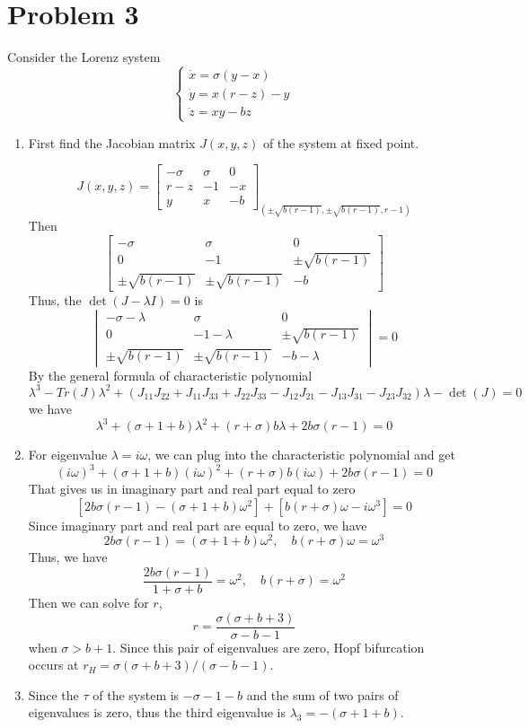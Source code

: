 \documentclass[12pt]{exam}
\begin{document}
\section*{Problem 3}
Consider the Lorenz system
\[ \begin{cases}
	\dot{x} = \sigma(y-x) \\
	\dot{y} = x(r - z) - y \\
	\dot{z} = xy - bz
\end{cases} \]

\begin{enumerate}
	\item First find the Jacobian matrix $J(x,y,z)$ of the system at fixed point.

	\[ J(x,y,z) = \begin{bmatrix}
		-\sigma & \sigma & 0 \\
		r-z & -1 & -x \\
		y & x & -b
	\end{bmatrix}_{(\pm \sqrt{b(r-1)}, \pm \sqrt{b(r-1)}, r-1)} \]
	Then
	\[ \begin{bmatrix}
		-\sigma & \sigma & 0 \\
		0 & -1 & \pm \sqrt{b(r-1)} \\
		\pm \sqrt{b(r-1)} & \pm \sqrt{b(r-1)} & -b
	\end{bmatrix} \]
	Thus, the $\det(J - \lambda I) = 0$ is	
	\[ \begin{vmatrix}
		-\sigma - \lambda & \sigma & 0 \\
		0 & -1 - \lambda & \pm \sqrt{b(r-1)} \\
		\pm \sqrt{b(r-1)} & \pm \sqrt{b(r-1)} & -b - \lambda
	\end{vmatrix} = 0 \]
	By the general formula of characteristic polynomial
	\[ \lambda^3 - Tr(J)\lambda^2 + (J_{11}J_{22} + J_{11}J_{33} + J_{22}J_{33} - J_{12}J_{21} - J_{13}J_{31} - J_{23}J_{32})\lambda - \det(J) = 0 \]
	we have
	\[ \lambda^3 + (\sigma + 1 + b)\lambda^2 + (r+\sigma)b\lambda + 2b\sigma (r-1) = 0 \]

	\item For eigenvalue $\lambda = i \omega$, we can plug into the characteristic polynomial and get
	\[ (i\omega)^3 + (\sigma + 1 + b)(i\omega)^2 + (r+\sigma)b(i\omega) + 2b\sigma (r-1) = 0 \]
	That gives us in imaginary part and real part equal to zero
	\[ [2b\sigma (r-1) - (\sigma + 1 + b)\omega^2] + [b(r+\sigma)\omega - i \omega^3] = 0 \]
	Since imaginary part and real part are equal to zero, we have
	\[ 2b\sigma (r-1) = (\sigma + 1 + b)\omega^2, \quad b(r+\sigma)\omega = \omega^3  \]
	Thus, we have
	\[ \frac{2b\sigma (r-1)}{1+\sigma+b} = \omega^2, \quad b(r+\sigma) = \omega^2 \]
	Then we can solve for $r$,
	\[ r = \frac{\sigma (\sigma + b + 3)}{\sigma - b - 1} \]
	when $\sigma > b + 1$. Since this pair of eigenvalues are zero, Hopf bifurcation occurs at $r_H = \sigma (\sigma + b + 3)/(\sigma - b - 1)$.

	\item Since the $\tau$ of the system is $-\sigma - 1 - b$ and the sum of two pairs of eigenvalues is zero, thus the third eigenvalue is $\lambda_3 = -(\sigma + 1 + b)$. 




\end{enumerate}
\end{document}
